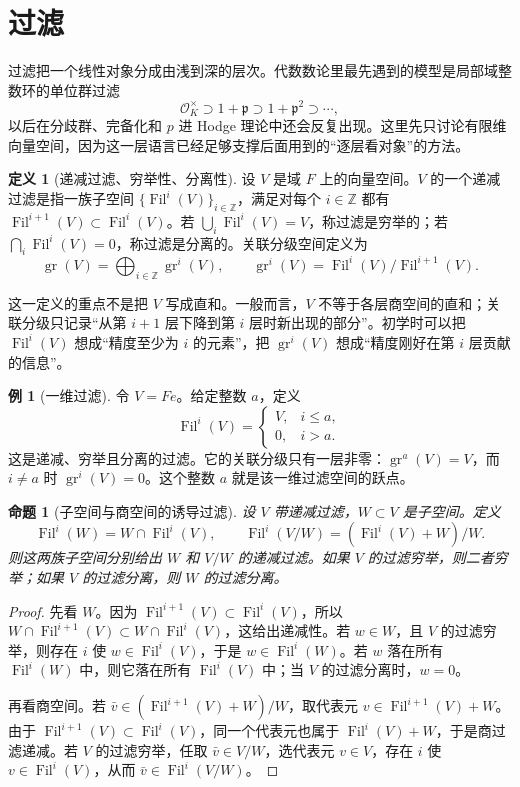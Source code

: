 \documentclass[11pt,a4paper,openany]{ctexbook}
\numberwithin{equation}{chapter}
\newcommand{\Z}{\mathbb{Z}}
\newcommand{\Fil}{\operatorname{Fil}}
\theoremstyle{plain}
\newtheorem{proposition}[theorem]{命题}
\theoremstyle{definition}
\newtheorem{definition}[theorem]{定义}
\newtheorem{example}[theorem]{例}
\theoremstyle{remark}
\begin{document}
\section{过滤}
过滤把一个线性对象分成由浅到深的层次。代数数论里最先遇到的模型是局部域整数环的单位群过滤
\[
\mathcal O_K^\times\supset 1+\mathfrak p\supset 1+\mathfrak p^2\supset\cdots,
\]
以后在分歧群、完备化和 $p$ 进 Hodge 理论中还会反复出现。这里先只讨论有限维向量空间，因为这一层语言已经足够支撑后面用到的“逐层看对象”的方法。

\begin{definition}[递减过滤、穷举性、分离性]
设 $V$ 是域 $F$ 上的向量空间。$V$ 的一个递减过滤是指一族子空间 $\{\Fil^i(V)\}_{i\in\Z}$，满足对每个 $i\in\Z$ 都有 $\Fil^{i+1}(V)\subset \Fil^i(V)$。若 $\bigcup_i\Fil^i(V)=V$，称过滤是穷举的；若 $\bigcap_i\Fil^i(V)=0$，称过滤是分离的。关联分级空间定义为
\[
\operatorname{gr}(V)=\bigoplus_{i\in\Z}\operatorname{gr}^i(V),
\qquad
\operatorname{gr}^i(V)=\Fil^i(V)/\Fil^{i+1}(V).
\]
\end{definition}

这一定义的重点不是把 $V$ 写成直和。一般而言，$V$ 不等于各层商空间的直和；关联分级只记录“从第 $i+1$ 层下降到第 $i$ 层时新出现的部分”。初学时可以把 $\Fil^i(V)$ 想成“精度至少为 $i$ 的元素”，把 $\operatorname{gr}^i(V)$ 想成“精度刚好在第 $i$ 层贡献的信息”。

\begin{example}[一维过滤]
令 $V=Fe$。给定整数 $a$，定义
\[
\Fil^i(V)=
\begin{cases}
V,&i\le a,\\
0,&i>a.
\end{cases}
\]
这是递减、穷举且分离的过滤。它的关联分级只有一层非零：$\operatorname{gr}^a(V)=V$，而 $i\ne a$ 时 $\operatorname{gr}^i(V)=0$。这个整数 $a$ 就是该一维过滤空间的跃点。
\end{example}

\begin{proposition}[子空间与商空间的诱导过滤]
设 $V$ 带递减过滤，$W\subset V$ 是子空间。定义
\[
\Fil^i(W)=W\cap\Fil^i(V),\qquad
\Fil^i(V/W)=(\Fil^i(V)+W)/W.
\]
则这两族子空间分别给出 $W$ 和 $V/W$ 的递减过滤。如果 $V$ 的过滤穷举，则二者穷举；如果 $V$ 的过滤分离，则 $W$ 的过滤分离。
\end{proposition}

\begin{proof}
先看 $W$。因为 $\Fil^{i+1}(V)\subset\Fil^i(V)$，所以 $W\cap\Fil^{i+1}(V)\subset W\cap\Fil^i(V)$，这给出递减性。若 $w\in W$，且 $V$ 的过滤穷举，则存在 $i$ 使 $w\in\Fil^i(V)$，于是 $w\in\Fil^i(W)$。若 $w$ 落在所有 $\Fil^i(W)$ 中，则它落在所有 $\Fil^i(V)$ 中；当 $V$ 的过滤分离时，$w=0$。

再看商空间。若 $\bar v\in(\Fil^{i+1}(V)+W)/W$，取代表元 $v\in\Fil^{i+1}(V)+W$。由于 $\Fil^{i+1}(V)\subset\Fil^i(V)$，同一个代表元也属于 $\Fil^i(V)+W$，于是商过滤递减。若 $V$ 的过滤穷举，任取 $\bar v\in V/W$，选代表元 $v\in V$，存在 $i$ 使 $v\in\Fil^i(V)$，从而 $\bar v\in\Fil^i(V/W)$。
\end{proof}
\end{document}
